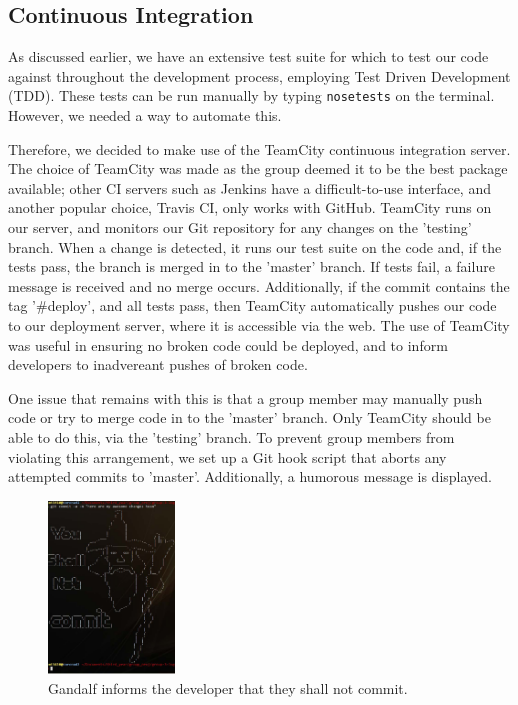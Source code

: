 \documentclass[a4paper, 11pt]{article}
\begin{document}
  \subsection{Continuous Integration}

    As discussed earlier, we have an extensive test suite for which to test our
    code against throughout the development process, employing Test Driven
    Development (TDD). These tests can be run manually by typing
    \texttt{nosetests} on the terminal. However, we needed a way to automate
    this.

    Therefore, we decided to make use of the TeamCity \cite{teamcity}
    continuous integration server. The choice of TeamCity was made as the group
    deemed it to be the best package available; other CI servers such as
    Jenkins have a difficult-to-use interface, and another popular choice,
    Travis CI, only works with GitHub. TeamCity runs on our server,
    and monitors our Git repository for any changes on the 'testing' branch.
    When a change is detected, it runs our test suite on the code and, if the
    tests pass, the branch is merged in to the 'master' branch. If tests fail,
    a failure message is received and no merge occurs. Additionally, if the
    commit contains the tag '\#deploy', and all tests pass, then TeamCity 
    automatically pushes our code to our deployment server, where it is 
    accessible via the web. The use of TeamCity was useful in ensuring no
    broken code could be deployed, and to inform developers to inadvereant
    pushes of broken code.

    One issue that remains with this is that a group member may manually push
    code or try to merge code in to the 'master' branch. Only TeamCity should
    be able to do this, via the 'testing' branch. To prevent group members from
    violating this arrangement, we set up a Git hook script that aborts any
    attempted commits to 'master'. Additionally, a humorous message is
    displayed.

    \begin{figure}[H]
      \centering
      \includegraphics[width=0.3\textwidth]{images/gandalf.jpg}
      \caption{Gandalf informs the developer that they shall not commit.}
    \end{figure}
\end{document}
